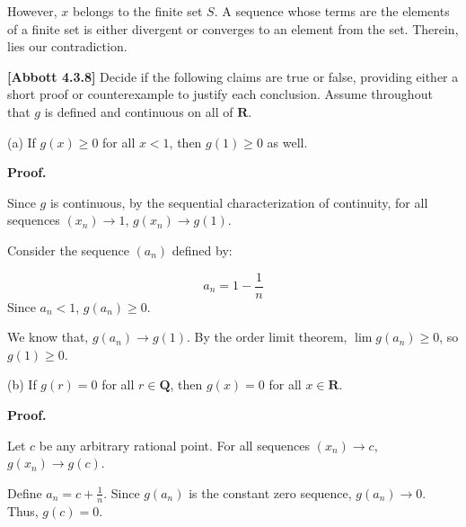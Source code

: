 \documentclass[10pt]{article}
\begin{document}
However, $\displaystyle x$ belongs to the finite set $\displaystyle S$. A sequence whose terms are the elements of a finite set is either divergent or converges to an element from the set. Therein, lies our contradiction.



\textbf{[Abbott 4.3.8]} Decide if the following claims are true or false, providing either a short proof or counterexample to justify each conclusion. Assume throughout that $\displaystyle g$ is defined and continuous on all of $\displaystyle \mathbf{R}$.



(a) If $\displaystyle g( x) \geq 0$ for all $\displaystyle x< 1$, then $\displaystyle g( 1) \geq 0$ as well.



\textbf{Proof.}

Since $\displaystyle g$ is continuous, by the sequential characterization of continuity, for all sequences $\displaystyle ( x_{n})\rightarrow 1$, $\displaystyle g( x_{n})\rightarrow g( 1)$.



Consider the sequence $\displaystyle ( a_{n})$ defined by:


\begin{equation*}
a_{n} =1-\frac{1}{n}
\end{equation*}
Since $\displaystyle a_{n} < 1$, $\displaystyle g( a_{n}) \geq 0$. 



We know that, $\displaystyle g( a_{n})\rightarrow g( 1)$. By the order limit theorem, $\displaystyle \lim g( a_{n}) \geq 0$, so $\displaystyle g( 1) \geq 0$.



(b) If $\displaystyle g( r) =0$ for all $\displaystyle r\in \mathbf{Q}$, then $\displaystyle g( x) =0$ for all $\displaystyle x\in \mathbf{R}$.



\textbf{Proof.}



Let $\displaystyle c$ be any arbitrary rational point. For all sequences $\displaystyle ( x_{n})\rightarrow c$, $\displaystyle g( x_{n})\rightarrow g( c)$. 



Define $\displaystyle a_{n} =c+\frac{1}{n}$. Since $\displaystyle g( a_{n})$ is the constant zero sequence, $\displaystyle g( a_{n})\rightarrow 0$. Thus, $\displaystyle g( c) =0$.
\end{document}
